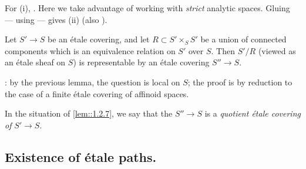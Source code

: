  For (i), \cf \cite[4.1.3, 4.1.4, 4.1.5]{ecfnas}.  Here we take advantage
 of working with {\it strict} analytic spaces.  Gluing --- using 
 \cite[1.3.3]{ecfnas} --- gives (ii) (\cf also \cite[2.3]{efgonas}).

\begin{lem}\label{lem::1.2.7} Let $S'\to S$ be an \'etale covering, and
 let $R\subset S'\times_S S'$ be a union of connected components which
 is an equivalence relation on $S'$ over $S$. Then $S'/R$ (viewed as an
 \'etale sheaf on $S$) is representable by an \'etale covering $S''\to S$. 
\end{lem}


\cf \cite[2.4]{efgonas}: by the previous lemma, the question is local on
 $S$; the proof is by reduction to the case of a finite \'etale covering
 of affinoid spaces. 

\medskip In the situation of \ref{lem::1.2.7}, we say that the $S''\to
 S$ is a {\it quotient \'etale covering of} $S'\to S$.


\subsection{Existence of \'etale paths.}\label{sub::1.3}  
 
